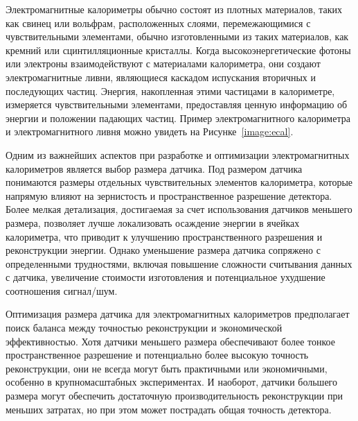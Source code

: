 \documentclass[a4paper,12pt]{extarticle}
\begin{document}
Электромагнитные калориметры обычно состоят из плотных материалов, таких как свинец или вольфрам, расположенных слоями, перемежающимися с чувствительными элементами, обычно изготовленными из таких материалов, как кремний или сцинтилляционные кристаллы. Когда высокоэнергетические фотоны или электроны взаимодействуют с материалами калориметра, они создают электромагнитные ливни, являющиеся каскадом испускания вторичных и последующих частиц. Энергия, накопленная этими частицами в калориметре, измеряется чувствительными элементами, предоставляя ценную информацию об энергии и положении падающих частиц. Пример электромагнитного калориметра и электромагнитного ливня можно увидеть на Рисунке~\ref{image:ecal}.

Одним из важнейших аспектов при разработке и оптимизации электромагнитных калориметров является выбор размера датчика. Под размером датчика понимаются размеры отдельных чувствительных элементов калориметра, которые напрямую влияют на зернистость и пространственное разрешение детектора. Более мелкая детализация, достигаемая за счет использования датчиков меньшего размера, позволяет лучше локализовать осаждение энергии в ячейках калориметра, что приводит к улучшению пространственного разрешения и реконструкции энергии. Однако уменьшение размера датчика сопряжено с определенными трудностями, включая повышение сложности считывания данных с датчика, увеличение стоимости изготовления и потенциальное ухудшение соотношения сигнал/шум.

Оптимизация размера датчика для электромагнитных калориметров предполагает поиск баланса между точностью реконструкции и экономической эффективностью. Хотя датчики меньшего размера обеспечивают более тонкое пространственное разрешение и потенциально более высокую точность реконструкции, они не всегда могут быть практичными или экономичными, особенно в крупномасштабных экспериментах. И наоборот, датчики большего размера могут обеспечить достаточную производительность реконструкции при меньших затратах, но при этом может пострадать общая точность детектора.
\end{document}
